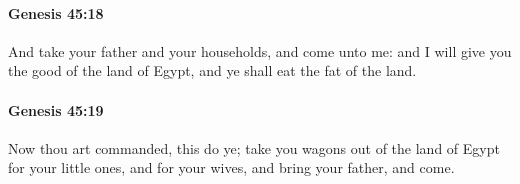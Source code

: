 		\paragraph{Genesis 45:18} %
			\label{GENESIS-45-18}

			And take your father and your households, and come unto me: and I will give you the good of the land of Egypt, and ye shall eat the fat of the land.


		\paragraph{Genesis 45:19} %
			\label{GENESIS-45-19}

			Now thou art commanded, this do ye; take you wagons out of the land of Egypt for your little ones, and for your wives, and bring your father, and come.


